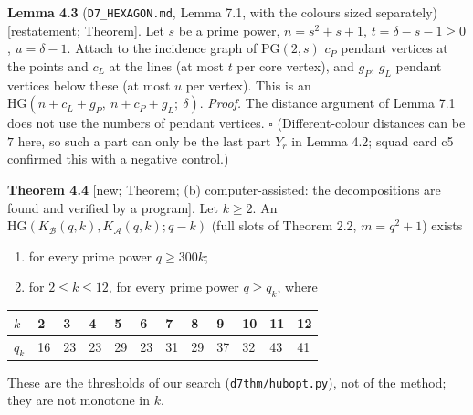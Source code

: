 \documentclass[
  10pt,
]{article}
\begin{document}
\textbf{Lemma 4.3} (\texttt{D7\_HEXAGON.md}, Lemma 7.1, with the colours
sized separately) {[}restatement; Theorem{]}. Let \(s\) be a prime
power, \(n=s^2+s+1\), \(t=\delta-s-1\ge0\), \(u=\delta-1\). Attach to
the incidence graph of \(\mathrm{PG}(2,s)\) \(c_P\) pendant vertices at
the points and \(c_L\) at the lines (at most \(t\) per core vertex), and
\(g_P\), \(g_L\) pendant vertices below these (at most \(u\) per
vertex). This is an \(\mathrm{HG}(n+c_L+g_P,\ n+c_P+g_L;\ \delta)\).
\emph{Proof.} The distance argument of Lemma 7.1 does not use the
numbers of pendant vertices. \(\square\) (Different-colour distances can
be \(7\) here, so such a part can only be the last part \(Y_r\) in Lemma
4.2; squad card c5 confirmed this with a negative control.)

\textbf{Theorem 4.4} {[}new; Theorem; (b) computer-assisted: the
decompositions are found and verified by a program{]}. Let \(k\ge2\). An
\(\mathrm{HG}(K_{\mathcal B}(q,k),K_{\mathcal A}(q,k);q-k)\) (full slots
of Theorem 2.2, \(m=q^2+1\)) exists

\begin{enumerate}
\def\labelenumi{(\alph{enumi})}
\item
  for every prime power \(q\ge300k\);
\item
  for \(2\le k\le12\), for every prime power \(q\ge q_k\), where
\end{enumerate}

\begin{longtable}[]{@{}llllllllllll@{}}
\toprule\noalign{}
\(k\) & 2 & 3 & 4 & 5 & 6 & 7 & 8 & 9 & 10 & 11 & 12 \\
\midrule\noalign{}
\endhead
\bottomrule\noalign{}
\endlastfoot
\(q_k\) & 16 & 23 & 23 & 29 & 23 & 31 & 29 & 37 & 32 & 43 & 41 \\
\end{longtable}

These are the thresholds of our search (\texttt{d7thm/hubopt.py}), not
of the method; they are not monotone in \(k\).
\end{document}
